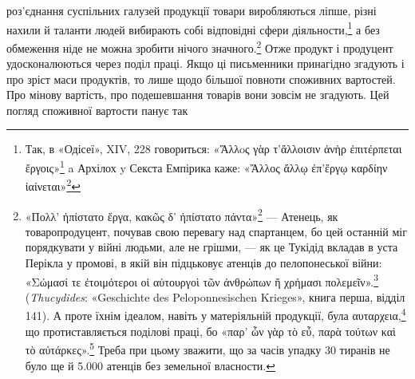 роз’єднання суспільних галузей продукції товари виробляються
ліпше, різні нахили й таланти людей вибирають собі відповідні
сфери діяльности,\footnote{
Так, в «Одісеї», XIV, 228 говориться: «\textgreek{Ἄλλoς γὰρ τ’ἄλλοισιν ἀνὴρ ἐπιτέρπεται ἔργοις}»\footnote*{
Одні люди люблять одне, інші — інше. \emph{Ред.}
} a Архілох y Секста Емпірика каже: «\textgreek{Ἄλλος ἄλλῳ ἐπ’ἔργῳ καρδίην ἰαίνεται}»\footnote*{
Одне тішить серце одного, інше — іншого. \emph{Ред.}
}} а без обмеження ніде не можна зробити нічого
значного.\footnote{
«\textgreek{Поλλ’ ἠπίστατο ἔργα, κακῶς δ’ ἠπίστατο πάντα}»\footnote*{
Багато знав він справ, та всі погано знав. \emph{Ред.}
} — Атенець, як товаропродуцент,
почував свою перевагу над спартанцем, бо цей останній міг
порядкувати у війні людьми, але не грішми, — як це Тукідід вкладав
в уста Перікла у промові, в якій він підцьковує атенців до пелопонеської
війни: «\textgreek{Σώμασί τε ἐτοιμότεροι οἱ αὐτουργοὶ τῶν ἀνθρώπων ἤ χρήμασι πολεμεῖν}».\footnote*{
Люди, що працюють для задоволення власних потреб, радше
віддадуть на війну свої тіла, ніж гроші. \emph{Ред.}
} (\emph{Thucydides}:
«Geschichte des Peloponnesischen Krieges», книга перша, відділ
141). А проте їхнім ідеалом, навіть у матеріяльній продукції, була
\textgreek{αυταρχεια},\footnote*{
— автаркія. \emph{Ред.}
} що протиставляється поділові праці, бо «\textgreek{παρ’ ὧν γὰρ τὸ εὖ, παρὰ τούτων καὶ τὸ
αὐτάρκες}».\footnote*{
«з цього постає благо, а з того і незалежність». \emph{Ред.}
} Треба при цьому зважити, що за часів упадку
30 тиранів не було ще й 5.000 атенців без земельної власности.
} Отже продукт і продуцент удосконалюються через
поділ праці. Якщо ці письменники принагідно згадують і про
зріст маси продуктів, то лише щодо більшої повноти споживних
вартостей. Про мінову вартість, про подешевшання товарів вони
зовсім не згадують. Цей погляд споживної вартости панує так
